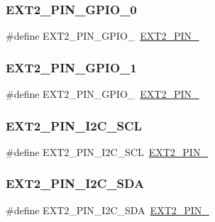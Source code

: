 \subsubsection{\texorpdfstring{EXT2\_PIN\_GPIO\_0}{EXT2\_PIN\_GPIO\_0}}
{\footnotesize\ttfamily \#define E\+X\+T2\+\_\+\+P\+I\+N\+\_\+\+G\+P\+I\+O\+\_~\mbox{\hyperlink{group__samd21__xplained__pro__features__group_gaa52e8320e78bf06a8f93ea43b4f1b150}{E\+X\+T2\+\_\+\+P\+I\+N\+\_}}}

\mbox{\label{group__samd21__xplained__pro__features__group_gaf648c02c3ac7022386a3d594031c91c8}} 
\subsubsection{\texorpdfstring{EXT2\_PIN\_GPIO\_1}{EXT2\_PIN\_GPIO\_1}}
{\footnotesize\ttfamily \#define E\+X\+T2\+\_\+\+P\+I\+N\+\_\+\+G\+P\+I\+O\+\_~\mbox{\hyperlink{group__samd21__xplained__pro__features__group_gac3b50faec712d1e3f555eb501d4626f8}{E\+X\+T2\+\_\+\+P\+I\+N\+\_}}}

\mbox{\label{group__samd21__xplained__pro__features__group_ga390a6363888bd30726641f8843a5224f}} 
\subsubsection{\texorpdfstring{EXT2\_PIN\_I2C\_SCL}{EXT2\_PIN\_I2C\_SCL}}
{\footnotesize\ttfamily \#define E\+X\+T2\+\_\+\+P\+I\+N\+\_\+\+I2\+C\+\_\+\+S\+CL~\mbox{\hyperlink{group__samd21__xplained__pro__features__group_gaa500ee1f5679975d1ed2a04657483df5}{E\+X\+T2\+\_\+\+P\+I\+N\+\_}}}

\mbox{\label{group__samd21__xplained__pro__features__group_ga2874591df29e0f0644227e0d7cf8fd33}} 
\subsubsection{\texorpdfstring{EXT2\_PIN\_I2C\_SDA}{EXT2\_PIN\_I2C\_SDA}}
{\footnotesize\ttfamily \#define E\+X\+T2\+\_\+\+P\+I\+N\+\_\+\+I2\+C\+\_\+\+S\+DA~\mbox{\hyperlink{group__samd21__xplained__pro__features__group_ga7508977dcf3c430814604914ceb0e6f7}{E\+X\+T2\+\_\+\+P\+I\+N\+\_}}}

